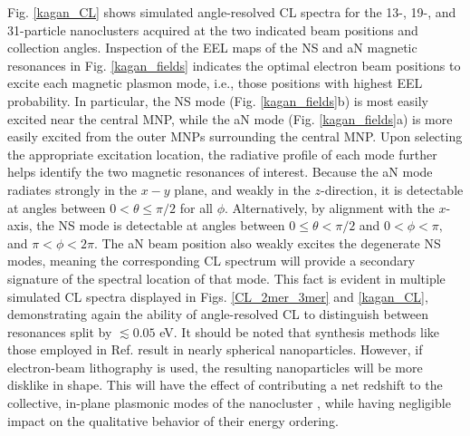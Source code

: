 \documentclass [11pt, proquest] {uwthesis}[2016/11/22]
\begin{document}
Fig. \ref{kagan_CL} shows simulated angle-resolved CL spectra for the 13-, 19-, and 31-particle nanoclusters acquired at the two indicated beam positions and collection angles. Inspection of the EEL maps of the NS and aN magnetic resonances in Fig. \ref{kagan_fields} indicates the optimal electron beam positions to excite each magnetic plasmon mode, i.e., those positions with highest EEL probability. In particular, the NS mode (Fig. \ref{kagan_fields}b) is most easily excited near the central MNP, while the aN mode (Fig. \ref{kagan_fields}a) is more easily excited from the outer MNPs surrounding the central MNP. Upon selecting the appropriate excitation location, the radiative profile of each mode further helps identify the two magnetic resonances of interest. Because the aN mode radiates strongly in the $x-y$ plane, and weakly in the $z$-direction, it is detectable at angles between $0 < \theta \leq \pi/2$ for all $\phi$. Alternatively, by alignment with the $x$-axis, the NS mode is detectable at angles between $0 \leq \theta < \pi/2$ and $0<\phi<\pi,$ and $\pi<\phi<2\pi.$ The aN beam position also weakly excites the degenerate NS modes, meaning the corresponding CL spectrum will provide a secondary signature of the spectral location of that mode. This fact is evident in multiple simulated CL spectra displayed in Figs. \ref{CL_2mer_3mer} and \ref{kagan_CL}, demonstrating again the ability of angle-resolved CL to distinguish between resonances split by $\lesssim0.05$ eV. It should be noted that synthesis methods like those employed in Ref. \cite{Engheta2017} result in nearly spherical nanoparticles. However, if electron-beam lithography is used, the resulting nanoparticles will be more disklike in shape. This will have the effect of contributing a net redshift to the collective, in-plane plasmonic modes of the nanocluster \cite{Noguez}, while having negligible impact on the qualitative behavior of their energy ordering.
\end{document}
